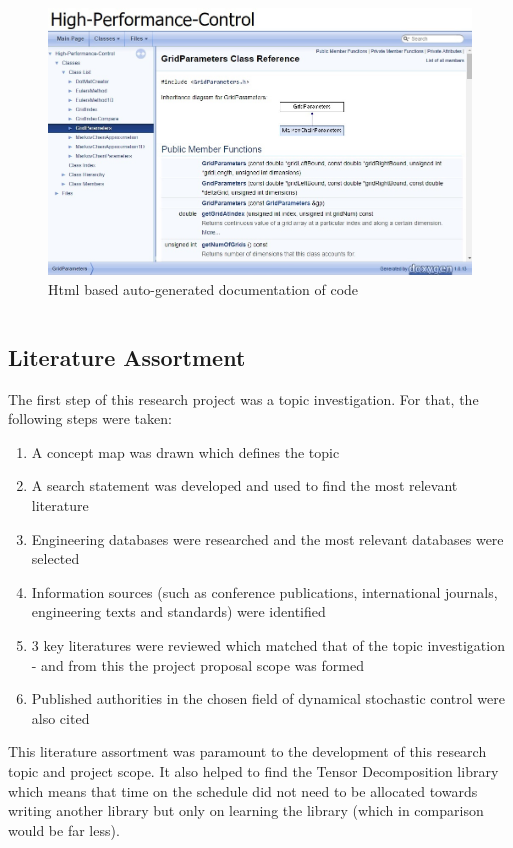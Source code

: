 \documentclass[11pt,draftd]{article}
\begin{document}
\begin{figure}[H]
	\centering
	\label{doxygen-documentation}
	\includegraphics[scale = 0.55]{images/doxygen-example}
	\caption{Html based auto-generated documentation of code}
\end{figure}
\[\]

\subsection{Literature Assortment}
The first step of this research project was a topic investigation. For that, the following steps were taken:
\begin{enumerate}
	\item A concept map was drawn which defines the topic
	\item A search statement was developed and used to find the most relevant literature
	\item Engineering databases were researched and the most relevant databases were selected
	\item Information sources (such as conference publications, international journals, engineering texts and standards) were identified
	\item 3 key literatures were reviewed which matched that of the topic investigation - and from this the project proposal scope was formed
	\item Published authorities in the chosen field of dynamical stochastic control were also cited	
\end{enumerate}
This literature assortment was paramount to the development of this research topic and project scope. It also helped to find the Tensor Decomposition library which means that time on the schedule did not need to be allocated towards writing another library but only on learning the library (which in comparison would be far less). \\
\end{document}
